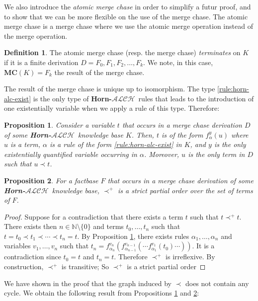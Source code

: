 \documentclass{article}
\newtheorem{proposition}{Proposition}[section]
\theoremstyle{definition}
\newtheorem{definition}{Definition}[section]
\theoremstyle{remark}
\def \N {\mathbb N}
\newcommand{\MC}{\textbf{MC}}
\newcommand{\ALCH}{\textbf{Horn-$\mathcal{ALCH}$}}
\begin{document}
We also introduce the \emph{atomic merge chase} in order to simplify a futur proof, and to show that we can be more flexible on the use of the merge chase. The atomic merge chase is a merge chase where we use the atomic merge operation instead of the merge operation.   

\begin{definition}
The atomic merge chase (resp. the merge chase)  \emph{terminates} on $K$ if it is a finite derivation $D=F_0,F_1,F_2,\ldots,F_k$. We note, in this case, $\MC(K) = F_k$ the result of the merge chase.
\end{definition}

The result of the merge chase is unique up to isomorphism. The type \ref{rule:horn-alc-exist} is the only type of \ALCH\ rules that leads to the introduction of one existentially variable when we apply a rule of this type. Therefore:

\begin{proposition} \label{prec}
Consider a variable $t$ that occurs in a merge chase derivation $D$ of some \ALCH\ knowledge base $K$.
Then, $t$ is of the form $f^y_\alpha(u)$ where $u$ is a term, $\alpha$ is a rule of the form \ref{rule:horn-alc-exist} in $K$, and $y$ is the only existentially quantified variable occurring in $\alpha$.
Moreover, $u$ is the only term in $D$ such that $u \prec t$.
\end{proposition}




\begin{proposition} \label{partial_order}
For a factbase $F$ that occurs in a merge chase derivation of some \ALCH\ knowledge base, $\prec^+$ is a strict partial order over the set of terms of $F$.
\end{proposition}

\begin{proof}
Suppose for a contradiction that there exists a term $t$ such that $t \prec^+ t$. There exists then $n \in \N \setminus \{0\}$ and terms $t_0,\ldots,t_n$ such that $t=t_0 \prec t_1 \prec \cdots \prec t_n = t$. By Proposition \ref{prec}, there exists rules $\alpha_1,\ldots, \alpha_n$ and variables $v_1,\ldots,v_n$ such that $t_n = f_{\alpha_n}^{v_n}(f_{\alpha_{n-1}}^{v_{n-1}}(\cdots f_{\alpha_1}^{v_1}(t_0)\cdots))$. It is a contradiction since $t_0 = t$ and $t_n=t$. Therefore $\prec^+$ is irreflexive. By construction, $\prec^+$ is transitive; So $\prec^+$ is a strict partial order
\end{proof}

We have shown in the proof that the graph induced by $\prec$ does not contain any cycle. We obtain the following result from Propositions \ref{prec} and \ref{partial_order}:
\end{document}
